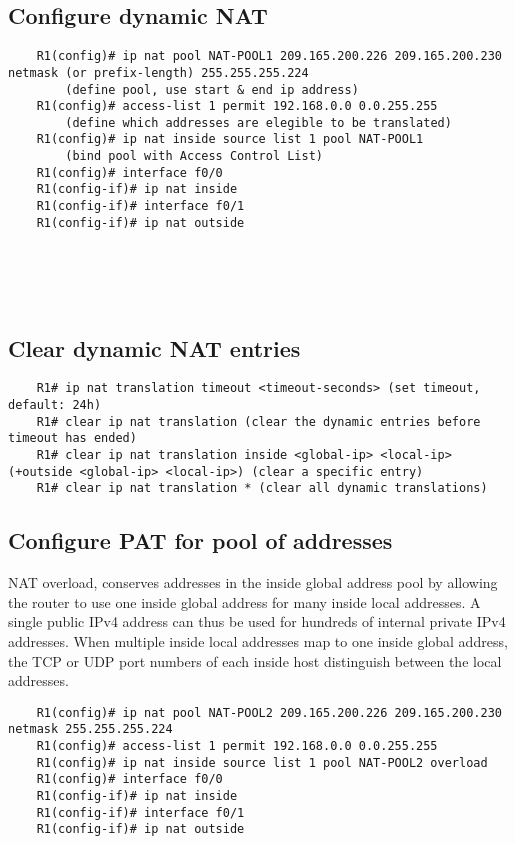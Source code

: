\documentclass[10pt, a4paper]{article}
\begin{document}
	\subsection{Configure dynamic NAT}
	\begin{lstlisting}
	R1(config)# ip nat pool NAT-POOL1 209.165.200.226 209.165.200.230 netmask (or prefix-length) 255.255.255.224
		(define pool, use start & end ip address)
	R1(config)# access-list 1 permit 192.168.0.0 0.0.255.255
		(define which addresses are elegible to be translated)
	R1(config)# ip nat inside source list 1 pool NAT-POOL1
		(bind pool with Access Control List)
	R1(config)# interface f0/0
	R1(config-if)# ip nat inside
	R1(config-if)# interface f0/1
	R1(config-if)# ip nat outside
	\end{lstlisting}
	\ \\ \\ \\

	\subsection{Clear dynamic NAT entries}
	\begin{lstlisting}
	R1# ip nat translation timeout <timeout-seconds> (set timeout, default: 24h)
	R1# clear ip nat translation (clear the dynamic entries before timeout has ended)
	R1# clear ip nat translation inside <global-ip> <local-ip> (+outside <global-ip> <local-ip>) (clear a specific entry)
	R1# clear ip nat translation * (clear all dynamic translations)
	\end{lstlisting}

	\subsection{Configure PAT for pool of addresses}
	NAT overload, conserves addresses in the inside global address pool by allowing the router to use one inside global address for many inside local addresses. A single public IPv4 address can thus be used for hundreds of internal private IPv4 addresses. When multiple inside local addresses map to one inside global address, the TCP or UDP port numbers of each inside host distinguish between the local addresses.\\
	\begin{lstlisting}
	R1(config)# ip nat pool NAT-POOL2 209.165.200.226 209.165.200.230 netmask 255.255.255.224
	R1(config)# access-list 1 permit 192.168.0.0 0.0.255.255
	R1(config)# ip nat inside source list 1 pool NAT-POOL2 overload
	R1(config)# interface f0/0
	R1(config-if)# ip nat inside
	R1(config-if)# interface f0/1
	R1(config-if)# ip nat outside
	\end{lstlisting}
\end{document}
